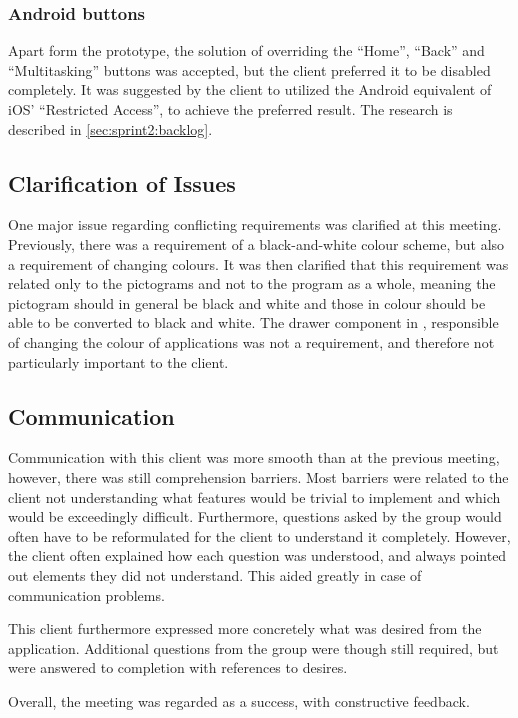 \subsubsection{Android buttons}
Apart form the prototype, the solution of overriding the ``Home'', ``Back'' and ``Multitasking'' buttons was accepted, but the client preferred it to be disabled completely.
It was suggested by the client to utilized the Android equivalent of iOS' ``Restricted Access'', to achieve the preferred result.
The research is described in \cref{sec:sprint2:backlog}.

\subsection{Clarification of Issues}\label{sec:sprint2:clarification}
One major issue regarding conflicting requirements was clarified at this meeting.
Previously, there was a requirement of a black-and-white colour scheme, but also a requirement of changing colours.
It was then clarified that this requirement was related only to the pictograms and not to the program as a whole, meaning the pictogram should in general be black and white and those in colour should be able to be converted to black and white.
The drawer component in \launcher, responsible of changing the colour of applications was not a requirement, and therefore not particularly important to the client.

\subsection{Communication}
Communication with this client was more smooth than at the previous meeting, however, there was still comprehension barriers.
Most barriers were related to the client not understanding what features would be trivial to implement and which would be exceedingly difficult.
Furthermore, questions asked by the group would often have to be reformulated for the client to understand it completely.
However, the client often explained how each question was understood, and always pointed out elements they did not understand.
This aided greatly in case of communication problems.

This client furthermore expressed more concretely what was desired from the application.
Additional questions from the group were though still required, but were answered to completion with references to desires.

Overall, the meeting was regarded as a success, with constructive feedback.